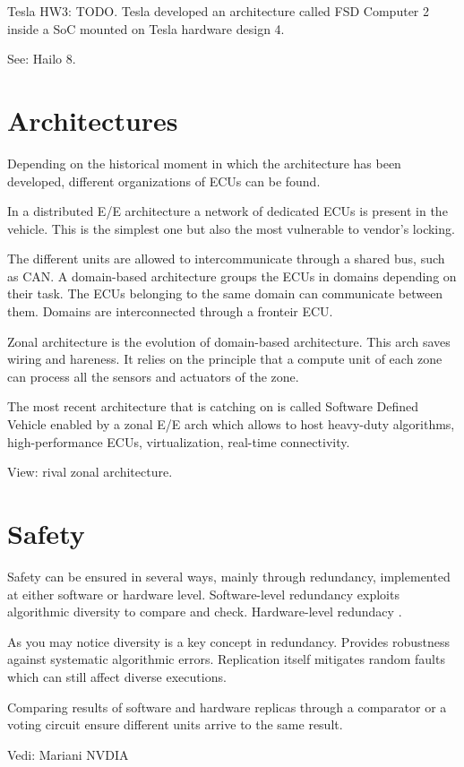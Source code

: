 Tesla HW3: TODO.
Tesla developed an architecture called FSD Computer 2 inside a SoC mounted on Tesla hardware design 4.

See: Hailo 8.

\section{Architectures}
Depending on the historical moment in which the architecture has been developed, different organizations of ECUs can be found.

In a distributed E/E architecture a network of dedicated ECUs is present in the vehicle.
This is the simplest one but also the most vulnerable to vendor's locking.

The different units are allowed to intercommunicate through a shared bus, such as CAN.
A domain-based architecture groups the ECUs in domains depending on their task. The ECUs belonging to the same domain can communicate between them.
Domains are interconnected through a fronteir ECU.

Zonal architecture is the evolution of domain-based architecture. This arch saves wiring and hareness.
It relies on the principle that a compute unit of each zone can process all the sensors and actuators of the zone.

The most recent architecture that is catching on is called Software Defined Vehicle enabled by a zonal E/E arch which allows to host heavy-duty algorithms, high-performance ECUs, virtualization, real-time connectivity.

View: rival zonal architecture.

\section{Safety}
Safety can be ensured in several ways, mainly through redundancy, implemented at either software or hardware level.
Software-level redundancy exploits algorithmic diversity to compare and check.
Hardware-level redundacy .

As you may notice diversity is a key concept in redundancy. Provides robustness against systematic algorithmic errors.
Replication itself mitigates random faults which can still affect diverse executions.

Comparing results of software and hardware replicas through a comparator or a voting circuit ensure different units arrive to the same result.

Vedi: Mariani NVDIA